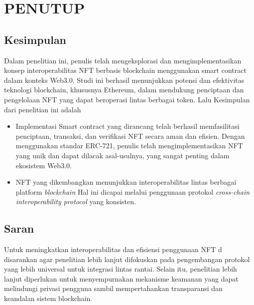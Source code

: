 \chapter{PENUTUP}
\label{chap:penutup}


\section{Kesimpulan}
\label{sec:kesimpulan}

Dalam penelitian ini, penulis telah mengeksplorasi dan mengimplementasikan konsep interoperabilitas NFT berbasis blockchain menggunakan smart contract dalam konteks Web3.0. Studi ini berhasil menunjukkan potensi dan efektivitas teknologi blockchain, khususnya Ethereum, dalam mendukung penciptaan dan pengelolaan NFT yang dapat beroperasi lintas berbagai token. Lalu Kesimpulan dari penelitian ini adalah
\begin{itemize}
\item Implementasi Smart contract yang dirancang telah berhasil memfasilitasi penciptaan, transaksi, dan verifikasi NFT secara aman dan efisien. Dengan menggunakan standar ERC-721, penulis telah mengimplementasikan NFT yang unik dan dapat dilacak asal-usulnya, yang sangat penting dalam ekosistem Web3.0.
\item NFT yang dikembangkan menunjukkan interoperabilitas lintas berbagai platform \emph{blockchain} Hal ini dicapai melalui penggunaan protokol \emph{cross-chain interoperability protocol} yang konsisten.
\end{itemize}

\section{Saran}
Untuk meningkatkan interoperabilitas dan efisiensi penggunaan NFT d disarankan agar penelitian lebih lanjut difokuskan pada pengembangan protokol yang lebih universal untuk integrasi lintas rantai. Selain itu, penelitian lebih lanjut diperlukan untuk menyempurnakan mekanisme keamanan yang dapat melindungi privasi pengguna sambil mempertahankan transparansi dan keandalan sistem blockchain.